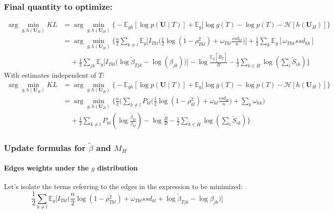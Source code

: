\documentclass[11pt,a4paper]{article}
\newcommand{\argmin}{\arg\!\min}
\newcommand{\entr}{\mathcal{H}}
\newcommand{\Ubf}{\boldsymbol{U}}
\newcommand{\Esp}{\mathds{E}}
\begin{document}
\subsubsection{Final quantity to optimize:}
\begin{align*}
\argmin_{g,h(\Ubf_H)} KL  &=\argmin_{g,h(\Ubf_H)}  \Big\{-\Esp_{gh}[\log p(\Ubf \mid T) ] + \Esp_g[\log g(T) - \log p(T)-\entr[h(\Ubf_H)]\Big\}\\
&= \argmin_{g,h(\Ubf_H)}  \bigg\{   \frac{n}{2}\sum _{k \neq l} \Esp_g\Big[ I_{Tkl}\Big(\frac{1}{2}\log(1-\rho_{Tkl}^2)+ \omega_{Tkl} \frac{ssd_{kl}}{n}\Big)\Big] +\frac{1}{2}  \sum_k \Esp_g[\omega_{Tkk} ssd_{kk}] \\
& \;\;\;\; +\frac{1}{2}\sum_{jk} \Esp_g\Big[I_{Tkl} \big(\log \widetilde{\beta}_{Tjk}-\log(\beta_{jk})\big)\Big] - \log \frac{\Esp_g[\widetilde{B}_T]}{B} -\frac{1}{2}\sum_{k\in H} \log\left(\sum_i \widetilde{S}_{ik}\right) \bigg\}
\end{align*}
With estimates independent of $T$:
\begin{align*}
\argmin_{g,h(\Ubf_H)} KL  &=\argmin_{g,h(\Ubf_H)}  \Big\{-\Esp_{gh}[\log p(\Ubf \mid T) ] + \Esp_g[\log g(T) - \log p(T)-\entr[h(\Ubf_H)]\Big\}\\
&= \argmin_{g,h(\Ubf_H)}  \bigg\{ \frac{n}{2}\Big(\sum _{ k \neq l} P_{kl}\Big(\frac{1}{2} \log (1-\rho_{kl}^2) + \omega_{kl} \frac{ssd_{kl}}{n}\Big) +  \sum_{k} \omega_{kk} \Big)\\
& \;\;\;\; + \frac{1}{2}\sum_{ k\neq l}P_{kl} \left(\log \frac{\widetilde{\beta}_{kl}}{{\beta}_{kl}}\right) - \log \frac{\widetilde{B}}{B} -\frac{1}{2}\sum_{k\in H} \log\left(\sum_i \widetilde{S}_{ik}\right) \bigg\}
\end{align*}
 
 
 \subsubsection{Update formulas for $\widetilde{\beta}$ and $M_H$ }

\paragraph{Edges weights under the $g$ distribution \\}
Let's isolate the terms referring to the edges in the expression to be minimized:
$$ \frac{1}{2}\sum _{k \neq l} \Esp_g\Big[I_{Tkl}\Big(\frac{n}{2} \log(1-\rho_{Tkl}^2)+ \omega_{Tkl}ssd_{kl}+\log \widetilde{\beta}_{Tjk}-\log\beta_{jk}\Big)\Big]  $$
 
\end{document}
